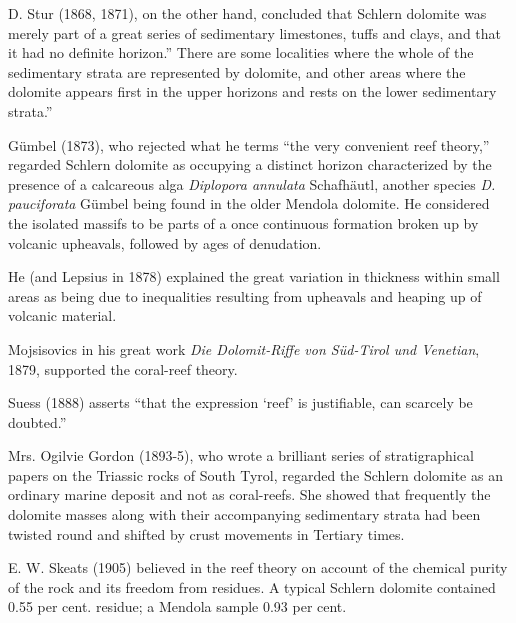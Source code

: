 \documentclass[a4paper, 12pt, oneside]{article}
\begin{document}
D. Stur (1868, 1871), on the other hand, concluded that Schlern dolomite was merely part of a great series of sedimentary limestones, tuffs and clays, and that it had no definite horizon.'' There are some localities where the whole of the sedimentary strata are represented by dolomite, and other areas where the dolomite appears first in the upper horizons and rests on the lower sedimentary strata.''

Gümbel (1873), who rejected what he terms ``the very convenient reef theory,'' regarded Schlern dolomite as occupying a distinct horizon characterized by the presence of a calcareous alga \emph{Diplopora annulata} Schafhäutl, another species \emph{D. pauciforata} Gümbel being found in the older Mendola dolomite. He considered the isolated massifs to be parts of a once continuous formation broken up by volcanic upheavals, followed by ages of denudation.

He (and Lepsius in 1878) explained the great variation in thickness within small areas as being due to inequalities resulting from upheavals and heaping up of volcanic material.

Mojsisovics in his great work \emph{Die Dolomit-Riffe von Süd-Tirol und Venetian}, 1879, supported the coral-reef theory.

Suess (1888) asserts ``that the expression `reef' is justifiable, can scarcely be doubted.''

Mrs. Ogilvie Gordon (1893-5), who wrote a brilliant series of stratigraphical papers on the Triassic rocks of South Tyrol, regarded the Schlern dolomite as an ordinary marine deposit and not as coral-reefs. She showed that frequently the dolomite masses along with their accompanying sedimentary strata had been twisted round and shifted by crust movements in Tertiary times.

E. W. Skeats (1905) believed in the reef theory on account of the chemical purity of the rock and its freedom from residues. A typical Schlern dolomite contained 0.55 per cent. residue; a Mendola sample 0.93 per cent.
\end{document}
